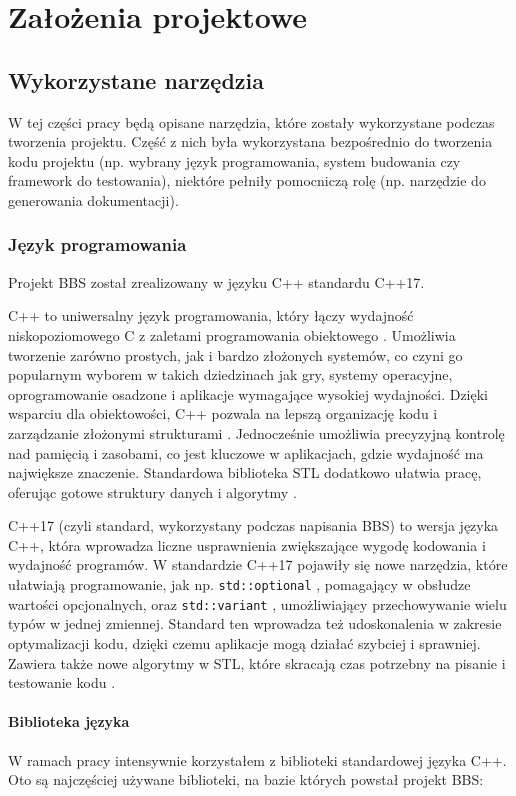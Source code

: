 \chapter{Założenia projektowe} \label{design}
\section{Wykorzystane narzędzia}
W tej części pracy będą opisane narzędzia, które zostały wykorzystane podczas tworzenia projektu. Część z nich była wykorzystana bezpośrednio do tworzenia kodu projektu (np. wybrany język programowania, system budowania czy framework do testowania), niektóre pełniły pomocniczą rolę (np. narzędzie do generowania dokumentacji).

\subsection{Język programowania}
Projekt BBS został zrealizowany w języku C++ standardu C++17.

C++ to uniwersalny język programowania, który łączy wydajność niskopoziomowego C z zaletami programowania obiektowego \cite{cpp}. Umożliwia tworzenie zarówno prostych, jak i bardzo złożonych systemów, co czyni go popularnym wyborem w takich dziedzinach jak gry, systemy operacyjne, oprogramowanie osadzone i aplikacje wymagające wysokiej wydajności. Dzięki wsparciu dla obiektowości, C++ pozwala na lepszą organizację kodu i zarządzanie złożonymi strukturami \cite{oop}. Jednocześnie umożliwia precyzyjną kontrolę nad pamięcią i zasobami, co jest kluczowe w aplikacjach, gdzie wydajność ma największe znaczenie. Standardowa biblioteka STL dodatkowo ułatwia pracę, oferując gotowe struktury danych i algorytmy \cite{cpp_reference}.

C++17 (czyli standard, wykorzystany podczas napisania BBS) to wersja języka C++, która wprowadza liczne usprawnienia zwiększające wygodę kodowania i wydajność programów. W standardzie C++17 pojawiły się nowe narzędzia, które ułatwiają programowanie, jak np. \texttt{std::optional} \cite{cpp_optional}, pomagający w obsłudze wartości opcjonalnych, oraz \texttt{std::variant} \cite{cpp_variant}, umożliwiający przechowywanie wielu typów w jednej zmiennej. Standard ten wprowadza też udoskonalenia w zakresie optymalizacji kodu, dzięki czemu aplikacje mogą działać szybciej i sprawniej. Zawiera także nowe algorytmy w STL, które skracają czas potrzebny na pisanie i testowanie kodu \cite{cpp17,cpp17_guide}.

\subsubsection{Biblioteka języka}
W ramach pracy intensywnie korzystałem z biblioteki standardowej języka C++. Oto są najczęściej używane biblioteki, na bazie których powstał projekt BBS:


